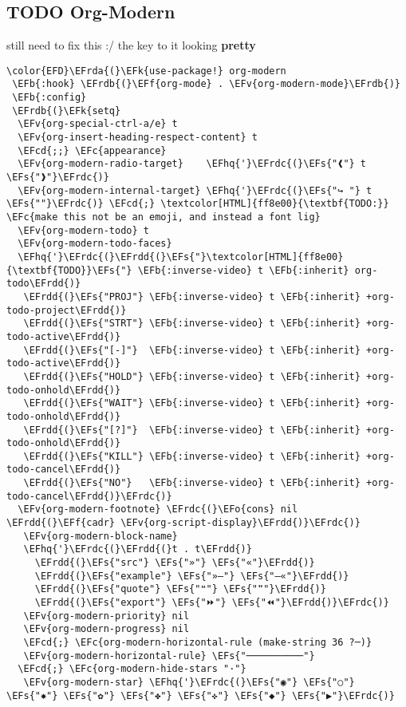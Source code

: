 \documentclass{article}
\newcommand{\EFc}[1]{\textcolor{EFc}{#1}} %
\newcommand{\EFcd}[1]{\textcolor{EFcd}{#1}} %
\newcommand{\EFs}[1]{\textcolor{EFs}{#1}} %
\newcommand{\EFk}[1]{\textcolor{EFk}{#1}} %
\newcommand{\EFb}[1]{\textcolor{EFb}{#1}} %
\newcommand{\EFf}[1]{\textcolor{EFf}{#1}} %
\newcommand{\EFv}[1]{\textcolor{EFv}{#1}} %
\newcommand{\EFo}[1]{\textcolor{EFo}{#1}} %
\newcommand{\EFhq}[1]{#1} %
\newcommand{\EFrda}[1]{\textcolor{EFrda}{#1}} %
\newcommand{\EFrdb}[1]{\textcolor{EFrdb}{#1}} %
\newcommand{\EFrdc}[1]{\textcolor{EFrdc}{#1}} %
\newcommand{\EFrdd}[1]{\textcolor{EFrdd}{#1}} %
\begin{document}
\subsection{{\bfseries\sffamily TODO} Org-Modern}
\label{sec:org090e6d0}
still need to fix this :/
the key to it looking \textbf{pretty}
\begin{Code}
\begin{Verbatim}
\color{EFD}\EFrda{(}\EFk{use-package!} org-modern
 \EFb{:hook} \EFrdb{(}\EFf{org-mode} . \EFv{org-modern-mode}\EFrdb{)}
 \EFb{:config}
 \EFrdb{(}\EFk{setq}
  \EFv{org-special-ctrl-a/e} t
  \EFv{org-insert-heading-respect-content} t
  \EFcd{;;} \EFc{appearance}
  \EFv{org-modern-radio-target}    \EFhq{'}\EFrdc{(}\EFs{"❰"} t \EFs{"❱"}\EFrdc{)}
  \EFv{org-modern-internal-target} \EFhq{'}\EFrdc{(}\EFs{"↪ "} t \EFs{""}\EFrdc{)} \EFcd{;} \textcolor[HTML]{ff8e00}{\textbf{TODO:}} \EFc{make this not be an emoji, and instead a font lig}
  \EFv{org-modern-todo} t
  \EFv{org-modern-todo-faces}
  \EFhq{'}\EFrdc{(}\EFrdd{(}\EFs{"}\textcolor[HTML]{ff8e00}{\textbf{TODO}}\EFs{"} \EFb{:inverse-video} t \EFb{:inherit} org-todo\EFrdd{)}
   \EFrdd{(}\EFs{"PROJ"} \EFb{:inverse-video} t \EFb{:inherit} +org-todo-project\EFrdd{)}
   \EFrdd{(}\EFs{"STRT"} \EFb{:inverse-video} t \EFb{:inherit} +org-todo-active\EFrdd{)}
   \EFrdd{(}\EFs{"[-]"}  \EFb{:inverse-video} t \EFb{:inherit} +org-todo-active\EFrdd{)}
   \EFrdd{(}\EFs{"HOLD"} \EFb{:inverse-video} t \EFb{:inherit} +org-todo-onhold\EFrdd{)}
   \EFrdd{(}\EFs{"WAIT"} \EFb{:inverse-video} t \EFb{:inherit} +org-todo-onhold\EFrdd{)}
   \EFrdd{(}\EFs{"[?]"}  \EFb{:inverse-video} t \EFb{:inherit} +org-todo-onhold\EFrdd{)}
   \EFrdd{(}\EFs{"KILL"} \EFb{:inverse-video} t \EFb{:inherit} +org-todo-cancel\EFrdd{)}
   \EFrdd{(}\EFs{"NO"}   \EFb{:inverse-video} t \EFb{:inherit} +org-todo-cancel\EFrdd{)}\EFrdc{)}
  \EFv{org-modern-footnote} \EFrdc{(}\EFo{cons} nil \EFrdd{(}\EFf{cadr} \EFv{org-script-display}\EFrdd{)}\EFrdc{)}
   \EFv{org-modern-block-name}
   \EFhq{'}\EFrdc{(}\EFrdd{(}t . t\EFrdd{)}
     \EFrdd{(}\EFs{"src"} \EFs{"»"} \EFs{"«"}\EFrdd{)}
     \EFrdd{(}\EFs{"example"} \EFs{"»–"} \EFs{"–«"}\EFrdd{)}
     \EFrdd{(}\EFs{"quote"} \EFs{"❝"} \EFs{"❞"}\EFrdd{)}
     \EFrdd{(}\EFs{"export"} \EFs{"⏩"} \EFs{"⏪"}\EFrdd{)}\EFrdc{)}
   \EFv{org-modern-priority} nil
   \EFv{org-modern-progress} nil
   \EFcd{;} \EFc{org-modern-horizontal-rule (make-string 36 ?─)}
   \EFv{org-modern-horizontal-rule} \EFs{"──────────"}
  \EFcd{;} \EFc{org-modern-hide-stars "·"}
   \EFv{org-modern-star} \EFhq{'}\EFrdc{(}\EFs{"◉"} \EFs{"○"} \EFs{"✸"} \EFs{"✿"} \EFs{"✤"} \EFs{"✜"} \EFs{"◆"} \EFs{"▶"}\EFrdc{)}

\end{Verbatim}
\end{Code}
\end{document}
